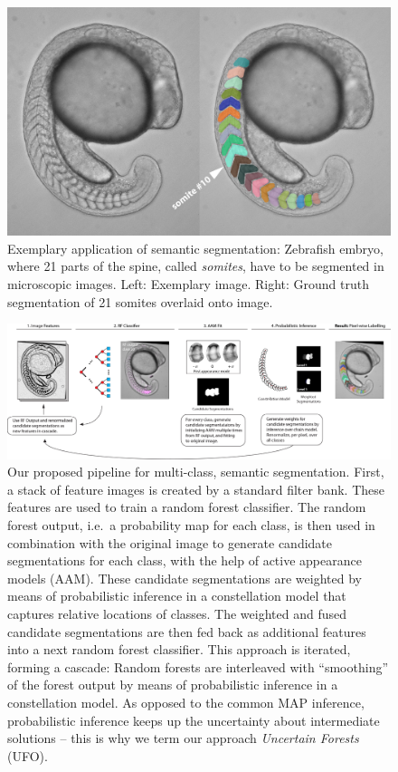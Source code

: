 \documentclass[10pt,twocolumn,letterpaper]{article}
\begin{document}
\begin{figure}[t]
\begin{center}
\includegraphics[width=\columnwidth]{TopRight.jpg} %
\caption{Exemplary application of semantic segmentation: Zebrafish embryo, where 21 parts of the spine, called \emph{somites}, have to be segmented in microscopic images. Left: Exemplary image. Right: Ground truth segmentation of 21 somites overlaid onto image. }
\label{fig:teaser}
\end{center}
\end{figure}
\begin{figure}[t]
\begin{center}
\includegraphics[width=\textwidth]{pipelineBIG2.jpg} %
\caption{Our proposed pipeline for multi-class, semantic segmentation. First, a stack of feature images is created by a standard filter bank. These features are used to train a random forest classifier. The random forest output, i.e.\ a probability map for each class, is then used in combination with the original image to generate candidate segmentations for each class, with the help of active appearance models (AAM). These candidate segmentations are weighted by means of probabilistic inference in a constellation model that captures relative locations of classes. The weighted and fused candidate segmentations are then fed back as additional features into a next random forest classifier. This approach is iterated, forming a cascade: Random forests are interleaved with ``smoothing'' of the forest output by means of probabilistic inference in a constellation model. As opposed to the common MAP inference, probabilistic inference keeps up the uncertainty about intermediate solutions -- this is why we term our approach \emph{Uncertain Forests} (UFO).}
\label{fig:pipeline}
\end{center}
\end{figure}
\end{document}
